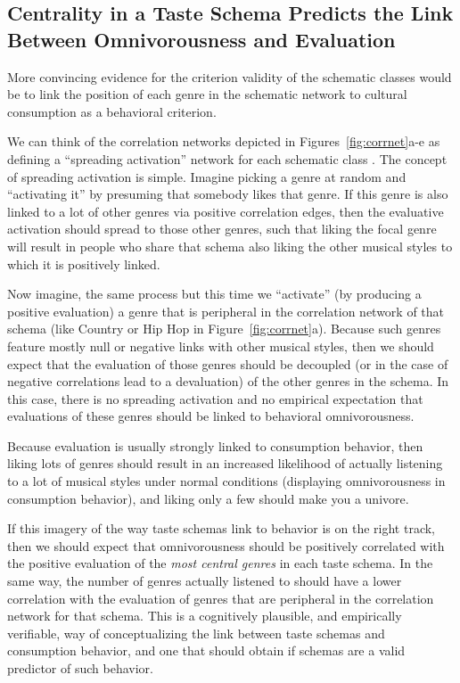 \documentclass[preprint, authoryear,11pt, 3p]{elsarticle}
\begin{document}
\subsection{Centrality in a Taste Schema Predicts the Link Between Omnivorousness and Evaluation}
More convincing evidence for the criterion validity of the schematic classes would be to link the position of each genre in the schematic network to cultural consumption as a behavioral criterion. 

We can think of the correlation networks depicted in Figures~\ref{fig:corrnet}a-e as defining a ``spreading activation'' network for each schematic class \citep{collins1975spreading}. The concept of spreading activation is simple. Imagine picking a genre at random and ``activating it'' by presuming that somebody likes that genre. If this genre is also linked to a lot of other genres via positive correlation edges, then the evaluative activation should spread to those other genres, such that liking the focal genre will result in people who share that schema also liking the other musical styles to which it is positively linked. 

Now imagine, the same process but this time we ``activate'' (by producing a positive evaluation) a genre that is peripheral in the correlation network of that schema (like Country or Hip Hop in Figure~\ref{fig:corrnet}a). Because such genres feature mostly null or negative links with other musical styles, then we should expect that the evaluation of those genres should be decoupled (or in the case of negative correlations lead to a devaluation) of the other genres in the schema. In this case, there is no spreading activation and no empirical expectation that evaluations of these genres should be linked to behavioral omnivorousness. 

Because evaluation is usually strongly linked to consumption behavior, then liking lots of genres should result in an increased likelihood of actually listening to a lot of musical styles under normal conditions (displaying omnivorousness  in consumption behavior), and liking only a few should make you a univore. 

If this imagery of the way taste schemas link to behavior is on the right track, then we should expect that omnivorousness should be positively correlated with the positive evaluation of the {\em most central genres} in each taste schema. In the same way, the number of genres actually listened to should have a lower correlation with the evaluation of genres that are peripheral in the correlation network for that schema. This is a cognitively plausible, and empirically verifiable, way of conceptualizing the link between taste schemas and consumption behavior, and one that should obtain if schemas are a valid predictor of such behavior. 
\end{document}
